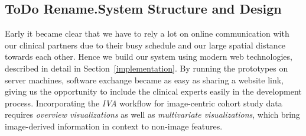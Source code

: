 \documentclass[journal]{style/vgtc} 			          %
\begin{document}
\subsection{ToDo Rename.System Structure and Design} \label{Structure and Workflow}
Early it became clear that we have to rely a lot on online communication with our clinical partners due to their busy schedule and our large spatial distance towards each other.
%
Hence we build our system using modern web technologies, described in detail in Section~\ref{implementation}.
%
By running the prototypes on server machines, software exchange became as easy as sharing a website link, giving us the opportunity to include the clinical experts easily in the development process.
%
Incorporating the \emph{IVA} workflow for image-centric cohort study data requires \emph{overview visualizations} as well as \emph{multivariate visualizations}, which bring image-derived information in context to non-image features.
\end{document}
